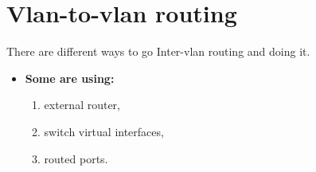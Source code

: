 \section{Vlan-to-vlan routing}


There are different ways to go  Inter-vlan routing and doing it.

\begin{itemize}
    \item \textbf{Some are using:}
    \begin{enumerate}
        \item external router,
        \item switch virtual interfaces,
        \item routed ports.
    \end{enumerate}
\end{itemize}